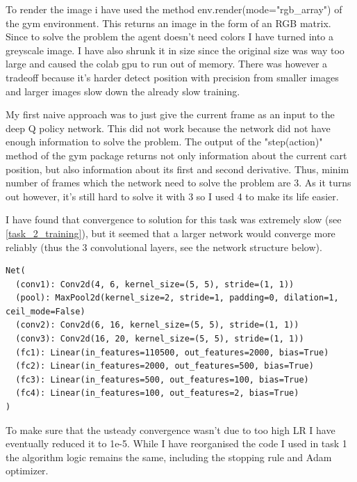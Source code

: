 \documentclass{article}
\begin{document}
To render the image i have used the method env.render(mode="rgb\_array") of the gym environment. This returns an image in the form of an RGB matrix. Since to solve the problem the agent doesn't need colors I have turned into a greyscale image. I have also shrunk it in size since the original size was way too large and caused the colab gpu to run out of memory. There was however a tradeoff because it's harder detect position with precision from smaller images and larger images slow down the already slow training.

My first naive approach was to just give the current frame as an input to the deep Q policy network. This did not work because the network did not have enough information to solve the problem. The output of the "step(action)" method of the gym package returns not only information about the current cart position, but also information about its first and second derivative. Thus, minim number of frames which the network need to solve the problem are 3. As it turns out however, it's still hard to solve it with 3 so I used 4 to make its life easier.


I have found that convergence to solution for this task was extremely slow (see \figurename{\ref{task_2_training}}), but it seemed that a larger network would converge more reliably (thus the 3 convolutional layers, see the network structure below).
\begin{lstlisting}
Net(
  (conv1): Conv2d(4, 6, kernel_size=(5, 5), stride=(1, 1))
  (pool): MaxPool2d(kernel_size=2, stride=1, padding=0, dilation=1, ceil_mode=False)
  (conv2): Conv2d(6, 16, kernel_size=(5, 5), stride=(1, 1))
  (conv3): Conv2d(16, 20, kernel_size=(5, 5), stride=(1, 1))
  (fc1): Linear(in_features=110500, out_features=2000, bias=True)
  (fc2): Linear(in_features=2000, out_features=500, bias=True)
  (fc3): Linear(in_features=500, out_features=100, bias=True)
  (fc4): Linear(in_features=100, out_features=2, bias=True)
)
\end{lstlisting}

To make sure that the usteady convergence wasn't due to too high LR I have eventually reduced it to 1e-5. While I have reorganised the code I used in task 1 the algorithm logic remains the same, including the stopping rule and Adam optimizer.
\end{document}
